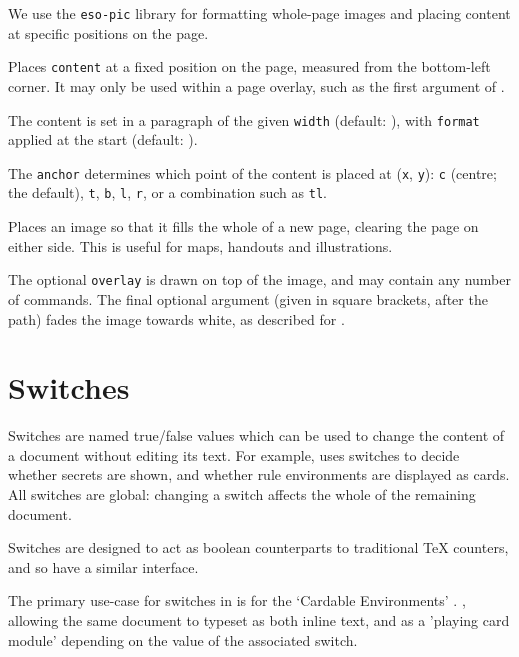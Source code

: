 		We use the \texttt{eso-pic} library for formatting whole-page images and placing content at specific positions on the page.
		{
			Places \texttt{content} at a fixed position on the page, measured from the bottom-left corner. It may only be used within a page overlay, such as the first argument of .

			The content is set in a paragraph of the given \texttt{width} (default: ), with \texttt{format} applied at the start (default: ).

			The \texttt{anchor} determines which point of the content is placed at (\texttt{x}, \texttt{y}): \texttt{c} (centre; the default), \texttt{t}, \texttt{b}, \texttt{l}, \texttt{r}, or a combination such as \texttt{tl}.
		}
		{
			Places an image so that it fills the whole of a new page, clearing the page on either side. This is useful for maps, handouts and illustrations.

			The optional \texttt{overlay} is drawn on top of the image, and may contain any number of  commands. The final optional argument (given in square brackets, after the path) fades the image towards white, as described for  .
		}

	\section{Switches}\label{S:Switches}

		Switches are named true/false values which can be used to change the content of a document without editing its text. For example, \rpgtex{} uses switches to decide whether secrets are shown, and whether rule environments are displayed as cards. All switches are global: changing a switch affects the whole of the remaining document.

		Switches are designed to act as boolean counterparts to traditional \TeX{} counters, and so have a similar interface.

		The primary use-case for switches in \rpgtex{} is for the `Cardable Environments' .
		, allowing the same document to typeset as both inline text, and as a 'playing card module' depending on the value of the associated switch.

